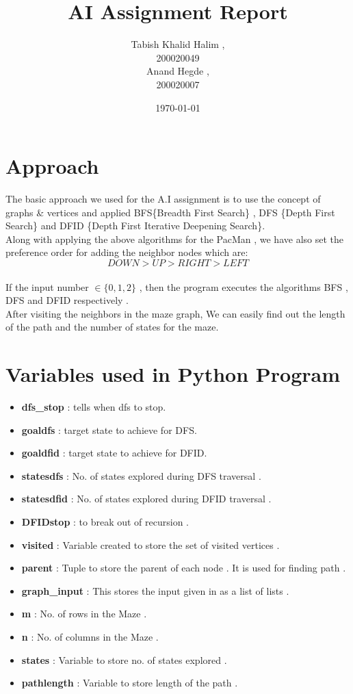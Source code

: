 \documentclass{article}
\title{AI Assignment Report}
\date{\today}
\author{Tabish Khalid Halim , \\ 200020049 \\ Anand Hegde , \\ 200020007}
\affil{Department of Computer Science, IIT Dharwad}
\begin{document}
\maketitle
{}
\newpage
\tableofcontents

\newpage
{}
\section{Approach}
The basic approach we used for the A.I assignment is to use the concept of graphs \& vertices and 
applied BFS\{Breadth First Search\} , DFS \{Depth First Search\} and DFID \{Depth First Iterative Deepening Search\}.
\vspace{10pt}
\\
Along with applying the above algorithms for the PacMan , we have also set the preference order for adding the neighbor nodes which are:
\\$$DOWN > UP > RIGHT > LEFT$$
\vspace{10pt}
\\If the input number $\in \{0,1,2\}$ , then the program executes the algorithms BFS , DFS and DFID respectively .
\vspace{10pt}
\\After visiting the neighbors in the maze graph, We can easily find out the length of the path and the number of states for the maze.
\newpage
\section{Variables used in Python Program}
\vspace{20pt}
\begin{itemize}
    \item \textbf{dfs\_stop} : tells when dfs to stop.
    \item \textbf{goaldfs} : target state to achieve for DFS.
    \item \textbf{goaldfid} : target state to achieve for DFID.
    \item \textbf{statesdfs} : No. of states explored during DFS traversal .
    \item \textbf{statesdfid} : No. of states explored during DFID traversal .
    \item \textbf{DFIDstop} : to break out of recursion .
    \item \textbf{visited} :  Variable created to store the set of visited vertices .
    \item \textbf{parent} : Tuple to store the parent of each node . It is used for finding path .
    \item \textbf{graph\_input} :  This stores the input given in as a list of lists .
    \item \textbf{m} : No. of rows in the Maze .
    \item \textbf{n} : No. of columns in the Maze .
    \item \textbf{states} : Variable to store no. of states explored .
    \item \textbf{pathlength} : Variable to store length of the path .
\end{itemize}
\newpage
\end{document}
